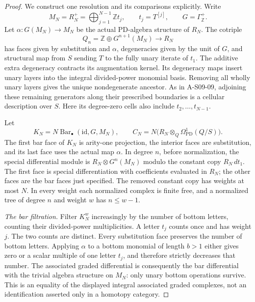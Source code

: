 \begin{proof}
We construct one resolution and its comparisons explicitly.
Write
\[
 M_N=R_N^+=\bigoplus_{j=1}^{N-1}\mathbb Zt_j,
 \qquad t_j=T^{[j]},\qquad G=\Gamma^+_{\mathbb Z}.
\]
Let $\alpha:G(M_N)\to M_N$ be the actual PD-algebra
structure of $R_N$.  The cotriple
\[
 Q_n=\mathbb Z\oplus G^{n+1}(M_N)\longrightarrow R_N
 \tag{S09.22}
\]
has faces given by substitution and $\alpha$, degeneracies
given by the unit of $G$, and structural map from $S$ sending
$T$ to the fully unary iterate of $t_1$.  The additive extra
degeneracy contracts its augmentation kernel.  Its degeneracy
maps insert unary layers into the integral divided-power
monomial basis.  Removing all wholly unary layers gives the
unique nondegenerate ancestor.  As in A-S09-09, adjoining
these remaining generators along their prescribed boundaries
is a cellular description over $S$.  Here its degree-zero
cells also include $t_2,\ldots,t_{N-1}$.

Let
\[
 K_N=N\operatorname{Bar}_\bullet(\mathrm{id},G,M_N),
 \qquad
 C_N=N\bigl(R_N\otimes_Q\Omega^1_{\mathrm{PD}}(Q/S)\bigr).
 \tag{S09.23}
\]
The first bar face of $K_N$ is arity-one projection, the
interior faces are substitution, and its last face uses the
actual map $\alpha$.  In degree $n$, before normalization,
the special differential module is
$R_N\otimes G^n(M_N)$ modulo the constant copy $R_N\,dt_1$.
The first face is special differentiation with coefficients
evaluated in $R_N$; the other faces are the bar faces just
specified.  The removed constant copy has weights at most
$N$.  In every weight each normalized complex is finite free,
and a normalized tree of degree $n$ and weight $w$ has
$n\leq w-1$.

\emph{The bar filtration.}
Filter $K_N^w$ increasingly by the number of bottom letters,
counting their divided-power multiplicities.  A letter $t_j$
counts once and has weight $j$.  The two counts are distinct.
Every substitution face preserves the number of bottom
letters.  Applying $\alpha$ to a bottom monomial of length
$b>1$ either gives zero or a scalar multiple of one letter
$t_j$, and therefore strictly decreases that number.
The associated graded differential is consequently the bar
differential with the trivial algebra structure on $M_N$:
only unary bottom operations survive.  This is an equality
of the displayed integral associated graded complexes, not
an identification asserted only in a homotopy category.


\end{proof}
